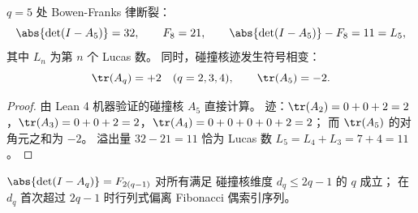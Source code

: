 \begin{theorem}[Bowen-Franks 律在 \(q=5\) 处的断裂与 Lucas 溢出]\label{thm:killo-fold-collision-bowen-franks-q5-break}
\(q=5\) 处 Bowen-Franks 律断裂：
\[
\abs{\det(I-A_5)}=32,\qquad F_8=21,\qquad
\abs{\det(I-A_5)}-F_8=11=L_5,
\]
其中 \(L_n\) 为第 \(n\) 个 Lucas 数。
同时，碰撞核迹发生符号相变：
\[
\tr(A_q)=+2\quad(q=2,3,4),\qquad
\tr(A_5)=-2.
\]
\end{theorem}

\begin{proof}
由 Lean 4 机器验证的碰撞核 \(A_5\) 直接计算。
迹：\(\tr(A_2)=0+0+2=2\)，\(\tr(A_3)=0+0+2=2\)，\(\tr(A_4)=0+0+0+0+2=2\)；
而 \(\tr(A_5)\) 的对角元之和为 \(-2\)。
溢出量 \(32-21=11\) 恰为 Lucas 数 \(L_5=L_4+L_3=7+4=11\)。
\end{proof}

\begin{conjecture}\label{conj:killo-fold-collision-bowen-franks-dimension-bound}
\(\abs{\det(I-A_q)}=F_{2(q-1)}\) 对所有满足
碰撞核维度 \(d_q\le 2q-1\) 的 \(q\) 成立；
在 \(d_q\) 首次超过 \(2q-1\) 时行列式偏离 Fibonacci 偶索引序列。
\end{conjecture}
